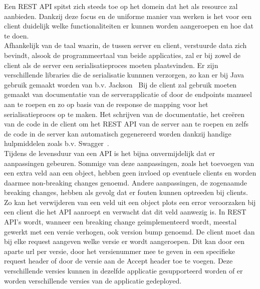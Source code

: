 Een REST API spitst zich steeds toe op het domein dat het als resource zal aanbieden.
Dankzij deze focus en de uniforme manier van werken is het voor een client duidelijk welke functionaliteiten er kunnen worden aangeroepen en hoe dat te doen.
~\autocite{jscrambler}
~\autocite{hubspot}
~\autocite{HTTP1.1vsHTTP2}\\

Afhankelijk van de taal waarin, de tussen server en client, verstuurde data zich bevindt, alsook de programmeertaal van beide applicaties,
zal er bij zowel de client als de server een serialisatieproces moeten plaatsvinden. Er zijn verschillende libraries die de serialisatie kunnnen verzorgen,
zo kan er bij Java gebruik gemaakt worden van b.v. Jackson~\parencite{jackson} \newline
Bij de client zal gebruik moeten gemaakt van documentatie van de serverapplicatie of door de endpoints manueel aan te roepen
en zo op basis van de response de mapping voor het serialisatieproces op te maken. Het schrijven van de documentatie,
het cre\"eren van de code in de client om het REST API van de server aan te roepen en zelfs de code in de server kan automatisch gegenereerd worden dankzij
handige hulpmiddelen zoals b.v. Swagger~\parencite{swagger}.\\
Tijdens de levensduur van een API is het bijna onvermijdelijk dat er aanpassingen gebeuren. Sommige van deze aanpassingen, zoals het toevoegen van een extra veld aan een object,
hebben geen invloed op eventuele clients en worden daarmee non-breaking changes genoemd. Andere aanpassingen, de zogenaamde breaking changes, hebben als gevolg dat er
fouten kunnen optreeden bij clients. Zo kan het verwijderen van een veld uit een object plots een error veroorzaken bij
een client die het API aanroept en verwacht dat dit veld aanwezig is. In REST API's wordt, wanneer een breaking change geimplementeerd wordt,
meestal gewerkt met een versie verhogen, ook version bump genoemd. De client moet dan bij elke request aangeven welke versie er wordt aangeroepen.
Dit kan door een aparte url per versie, door het versienummer mee te geven in een specifieke request header of door de versie aan de Accept header toe te voegen.
Deze verschillende versies kunnen in dezelfde applicatie gesupporteerd worden of er worden verschillende versies van de applicatie gedeployed.
~\autocite{restversion}\\

